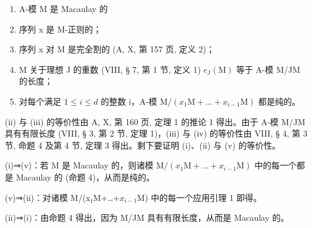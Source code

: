 \begin{enumerate}
\def\labelenumi{(\roman{enumi})}
\item
  A-模 M 是 Macaulay 的
\item
  序列 x 是 M-正则的；
\item
  序列 x 对 M 是完全割的 (A, X, 第 157 页, 定义 2)；
\item
  M 关于理想 J 的重数 (VIII, § 7, 第 1 节, 定义 1) \(e_{\mathrm{J}}(\mathrm{M})\) 等于 A-模 M/JM 的长度；
\item
  对每个满足 \(1 \leqslant i \leqslant d\) 的整数 i，A-模 \(\mathrm{M}/(x_{1}\mathrm{M}+\ldots+x_{i-1}\mathrm{M})\) 都是纯的。
\end{enumerate}

(ii) 与 (iii) 的等价性由 A, X, 第 160 页, 定理 1 的推论 1 得出。由于 A-模 M/JM 具有有限长度 (VIII, § 3, 第 2 节, 定理 1)，(iii) 与 (iv) 的等价性由 VIII, § 4, 第 3 节, 命题 4 及第 4 节, 定理 3 得出。剩下要证明 (i)、(ii) 与 (v) 的等价性。

(i)⇒(v)：若 M 是 Macaulay 的，则诸模 \(\mathrm{M}/(x_{1}\mathrm{M}+\ldots+x_{i-1}\mathrm{M})\) 中的每一个都是 Macaulay 的 (命题 4)，从而是纯的。

(v)⇒(ii)：对诸模 M/(x₁M+\ldots+\(x_{i-1}\){}M) 中的每一个应用引理 1 即得。

(ii)⇒(i)：由命题 4 得出，因为 M/JM 具有有限长度，从而是 Macaulay 的。

